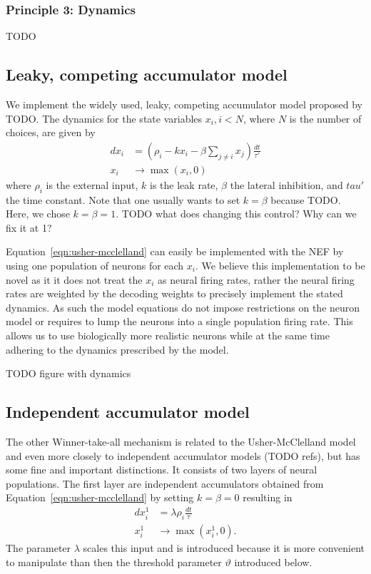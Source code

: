 \documentclass[10pt,letterpaper]{article}
\begin{document}
\subsubsection{Principle 3: Dynamics}
TODO

\subsection{Leaky, competing accumulator model}
We implement the widely used, leaky, competing accumulator model proposed by 
TODO\@. The dynamics for the state variables $x_i, i < N$, where $N$ is the 
number of choices, are given by
\begin{equation}\label{eqn:usher-mcclelland}
    \begin{split}
    dx_i &= \left(\rho_i - kx_i - \beta \sum_{j \neq i} x_j\right) 
    \frac{dt}{\tau'} \\
    x_i &\rightarrow \max(x_i, 0)
    \end{split}
\end{equation}
where $\rho_i$ is the external input, $k$ is the leak rate, $\beta$ the lateral 
inhibition, and $tau'$ the time constant. Note that one usually wants to set $k 
= \beta$ because TODO\@. Here, we chose $k = \beta = 1$. TODO what does changing 
this control? Why can we fix it at 1?

Equation~\ref{eqn:usher-mcclelland} can easily be implemented with the NEF by 
using one population of neurons for each $x_i$.  We believe this implementation 
to be novel as it it does not treat the $x_i$ as neural firing rates, rather the 
neural firing rates are weighted by the decoding weights to precisely implement 
the stated dynamics. As such the model equations do not impose restrictions on 
the neuron model or requires to lump the neurons into a single population firing 
rate. This allows us to use biologically more realistic neurons while at the 
same time adhering to the dynamics prescribed by the model.

TODO figure with dynamics

\subsection{Independent accumulator model}
The other Winner-take-all mechanism is related to the Usher-McClelland model and 
even more closely to independent accumulator models (TODO refs), but has some 
fine and important distinctions. It consists of two layers of neural 
populations. The first layer are independent accumulators obtained from 
Equation~\ref{eqn:usher-mcclelland} by setting $k = \beta = 0$ resulting in
\begin{equation}
    \begin{split}
    dx^1_i &= \lambda \rho_i \frac{dt}{\tau} \\
    x^1_i &\rightarrow \max(x^1_i, 0) \text{.}
    \end{split}
\end{equation}
The parameter $\lambda$ scales this input and is introduced because it is more 
convenient to manipulate than then the threshold parameter $\vartheta$ 
introduced below.
\end{document}
